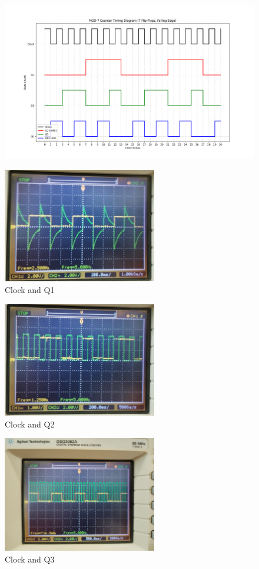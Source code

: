 \documentclass[a4paper,12pt]{article}
\begin{document}
\begin{figure}[H]
\centering
\includegraphics[width=\textwidth]{figs/Plot.png}
\end{figure}
\begin{figure}[H]
\centering
\includegraphics[width=0.6\textwidth]{figs/fig1.jpeg}
\caption{Clock and Q1}
\end{figure}
\begin{figure}[H]
\centering
\includegraphics[width=0.6\textwidth]{figs/fig2.jpeg}
\caption{Clock and Q2}
\end{figure}
\begin{figure}[H]
\centering
\includegraphics[width=0.6\textwidth]{figs/fig3.jpeg}
\caption{Clock and Q3}
\end{figure}
\end{document}
